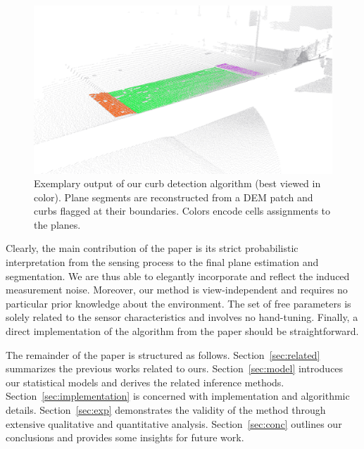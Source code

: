 \begin{figure}[t]
\centering
\includegraphics[width=\columnwidth]{fig/intro-curb.eps}
\caption{Exemplary output of our curb detection algorithm (best viewed in
color). Plane segments are reconstructed from a DEM patch and curbs flagged at
their boundaries. Colors encode cells assignments to the planes.\vspace{-1.5mm}}
\label{fig:intro}
\end{figure}

Clearly, the main contribution of the paper is its strict probabilistic
interpretation from the sensing process to the final plane estimation and
segmentation. We are thus able to elegantly incorporate and reflect the
induced measurement noise. Moreover, our method is view-independent and requires
no particular prior knowledge about the environment. The set of free parameters
is solely related to the sensor characteristics and involves no hand-tuning.
Finally, a direct implementation of the algorithm from the paper should be
straightforward.

The remainder of the paper is structured as follows. Section~\ref{sec:related}
summarizes the previous works related to ours. Section~\ref{sec:model}
introduces our statistical models and derives the related inference methods.
Section~\ref{sec:implementation} is concerned with implementation and
algorithmic details. Section~\ref{sec:exp} demonstrates the validity of the
method through extensive qualitative and quantitative analysis.
Section~\ref{sec:conc} outlines our conclusions and provides some insights for
future work.
